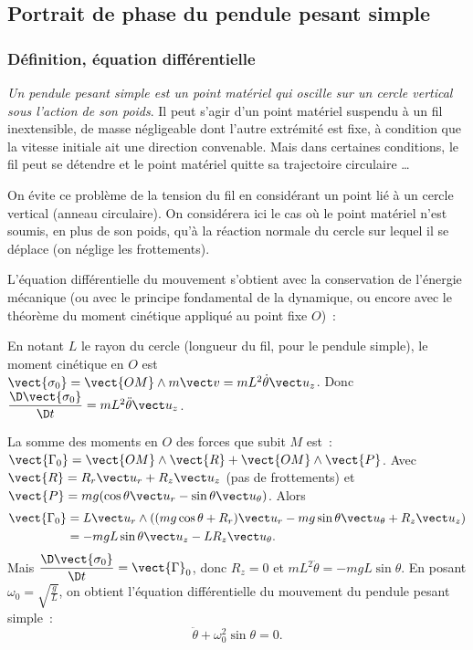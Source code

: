 \subsection{Portrait de phase du pendule pesant simple}
\label{chap5-subsec:portraitdephasepesantsimple}

\subsubsection{Définition, équation différentielle}

\emph{Un pendule pesant simple est un point matériel qui oscille sur un cercle vertical sous l'action de son poids}. Il peut s'agir d'un point matériel suspendu à un fil inextensible, de masse négligeable dont l'autre extrémité est fixe, à condition que la vitesse initiale ait une direction convenable. Mais dans certaines conditions, le fil peut se détendre et le point matériel quitte sa trajectoire circulaire \ldots

On évite ce problème de la tension du fil en considérant un point lié à un cercle vertical (anneau circulaire). On considérera ici le cas où le point matériel n'est soumis, en plus de son poids, qu'à la réaction normale du cercle sur lequel il se déplace (on néglige les frottements).

L'équation différentielle du mouvement s'obtient avec la conservation de l'énergie mécanique (ou avec le principe fondamental de la dynamique, ou encore avec le théorème du moment cinétique appliqué au point fixe $O$)~:

En notant $L$ le rayon du cercle (longueur du fil, pour le pendule simple), le moment cinétique en $O$ est $\vect{\sigma_0} = \vect{OM}\wedge m \vv = mL^2\dot{\theta}\uz$. Donc $\derived{\vect{\sigma_0}}{t}=mL^2\ddot{\theta}\uz$.

La somme des moments en $O$ des forces que subit $M$ est~: $\vect{\Gamma_0}=\vect{OM}\wedge\vect{R}+\vect{OM}\wedge\vect{P}$. Avec $\vect{R} = R_r \ur +R_z \uz$ (pas de frottements) et $\vect{P}=mg(\cos\theta \ur -\sin\theta \utheta)$. Alors
\begin{align}
  \vect{\Gamma_0} &= L \ur \wedge \left( (mg\cos\theta +R_r)\ur - mg\sin\theta\utheta +R_z\uz\right) \\ 
  & = -mgL\sin\theta\uz - LR_z\utheta.
\end{align}
Mais $\derived{\vect{\sigma_0}}{t} = \vect{\Gamma}_0$, donc $R_z=0$ et $mL^2\ddot{\theta}=-mgL\sin\theta$. En posant $\omega_0 = \sqrt{\frac{g}{L}}$, on obtient l'équation différentielle du mouvement du pendule pesant simple~:
\begin{equation}
  \ddot{\theta} + \omega_0^2\sin\theta =0.
\end{equation}

